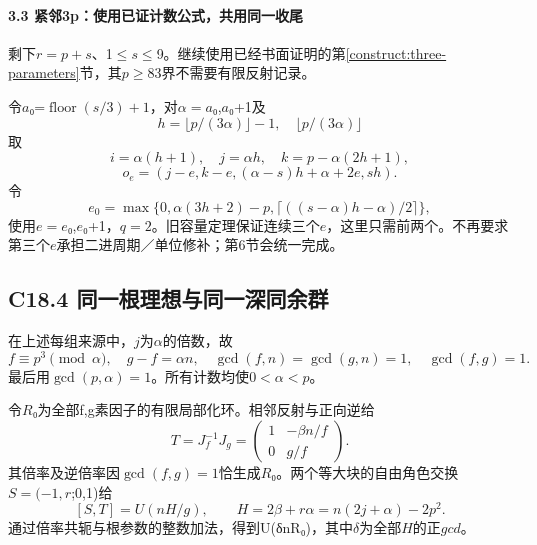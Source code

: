 \documentclass[11pt,a4paper]{article}
\theoremstyle{definition}
\numberwithin{equation}{section}
\begin{document}
\paragraph*{\texorpdfstring{{3.3} {紧邻3p：使用已证计数公式，共用同一收尾}}{3.3 紧邻3p：使用已证计数公式，共用同一收尾}}\label{C18-h134}

{剩下\ensuremath{r=p+s}、1\ensuremath{\le}\ensuremath{s}\ensuremath{\le}9。继续使用已经书面证明的}第\ref{construct:three-parameters}节{，其\ensuremath{p}\ensuremath{\ge}83界不需要有限反射记录。}

{令\ensuremath{a}₀=\ensuremath{\operatorname{floor}(s/3)+1}，对\ensuremath{\alpha =a}₀,\ensuremath{a}₀+1及} \[
h=\lfloor p/(3\alpha)\rfloor-1,\quad\lfloor p/(3\alpha)\rfloor
\] {取} \[
i=\alpha(h+1),\quad j=\alpha h,\quad k=p-\alpha(2h+1),
\] \[
o_e=(j-e,k-e,(\alpha-s)h+\alpha+2e,sh).
\tag{C18.3.7}
\] {令} \[
e_0=\max\{0,\alpha(3h+2)-p,\lceil((s-\alpha)h-\alpha)/2\rceil\},
\] {使用\ensuremath{e=e}₀,\ensuremath{e}₀+1，\ensuremath{q=2}。旧容量定理保证连续三个\ensuremath{e}，这里只需前两个。不再要求第三个\ensuremath{e}承担二进周期／单位修补；第6节会统一完成。}

\subsection*{\texorpdfstring{{C18.4} {同一根理想与同一深同余群}}{C18.4 同一根理想与同一深同余群}}\label{C18-h135}

{在上述每组来源中，\ensuremath{j}为\ensuremath{\alpha }的倍数，故} \[
f\equiv p^3\pmod\alpha,\quad
g-f=\alpha n,\quad
\gcd(f,n)=\gcd(g,n)=1,
\quad\gcd(f,g)=1.
\] {最后用\ensuremath{\operatorname{gcd}(p,\alpha )=1}。所有计数均使\ensuremath{0<\alpha <p}。}

{令\ensuremath{R}₀为全部f,g素因子的有限局部化环。相邻反射与正向逆给} \[
T=J_f^{-1}J_g=
\begin{pmatrix}1&-\beta n/f\\0&g/f\end{pmatrix}.
\] {其倍率及逆倍率因\ensuremath{\operatorname{gcd}(f,g)=1}恰生成\ensuremath{R}₀。两个等大块的自由角色交换\ensuremath{S=(-1,r};0,1)给} \[
\boxed{[S,T]=U(nH/g),\qquad
H=2\beta+r\alpha=n(2j+\alpha)-2p^2.}
\tag{C18.4.1}
\] {通过倍率共轭与根参数的整数加法，得到U(δnR₀)，其中\ensuremath{\delta }为全部\ensuremath{H}的正\ensuremath{gcd}。}
\end{document}
